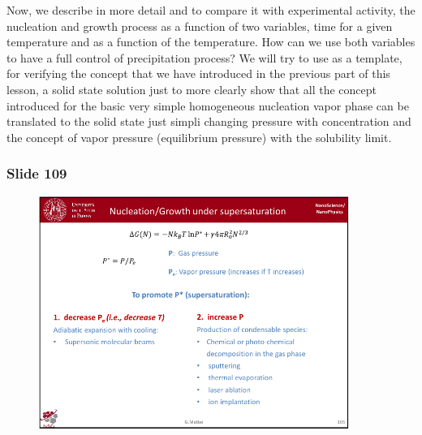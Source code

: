 \documentclass[../main/main.tex]{subfiles}
\begin{document}
Now, we describe in more detail and to compare it with experimental activity, the nucleation and growth process as a function of two variables, time for a given temperature and as a function of the temperature. How can we use both variables to have a full control of precipitation process? We will try to use as a template, for verifying the concept that we have introduced in the previous part of this lesson, a solid state solution just to more clearly show that all the concept introduced for the basic very simple homogeneous nucleation vapor phase can be translated to the solid state just simpli changing pressure with concentration
and the concept of vapor pressure (equilibrium pressure) with the solubility limit.

\newpage

\subsubsection{Slide 109}

\begin{figure}[h!]
\centering
\includegraphics[page=5,width=0.9\textwidth]{../lessons/pdf_file/7_lesson.pdf}
\end{figure}
\end{document}
